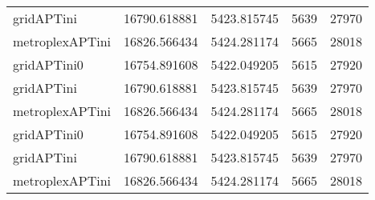 \begin{tabular}{lrrrr}
gridAPTini & 16790.618881 & 5423.815745 & 5639 & 27970 \\
metroplexAPTini & 16826.566434 & 5424.281174 & 5665 & 28018 \\
gridAPTini0 & 16754.891608 & 5422.049205 & 5615 & 27920 \\
gridAPTini & 16790.618881 & 5423.815745 & 5639 & 27970 \\
metroplexAPTini & 16826.566434 & 5424.281174 & 5665 & 28018 \\
gridAPTini0 & 16754.891608 & 5422.049205 & 5615 & 27920 \\
gridAPTini & 16790.618881 & 5423.815745 & 5639 & 27970 \\
metroplexAPTini & 16826.566434 & 5424.281174 & 5665 & 28018 \\
\bottomrule
\end{tabular}
